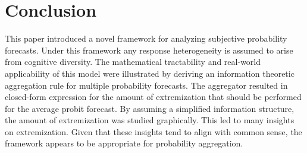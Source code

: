 \documentclass[11pt,twoside]{article}
\begin{document}
%


%


\section{Conclusion}
This paper introduced a novel framework for analyzing subjective probability forecasts. Under this framework any response heterogeneity is assumed to arise from cognitive diversity. The mathematical tractability and real-world applicability of this model were illustrated by deriving an information theoretic aggregation rule for multiple probability forecasts. The aggregator resulted in closed-form expression for the amount of extremization that should be performed for the average probit forecast. By assuming a simplified information structure, the amount of extremization was studied graphically. This led to many insights on extremization. Given that these insights tend to align with common sense, the framework appears to be appropriate for probability aggregation.
\end{document}
